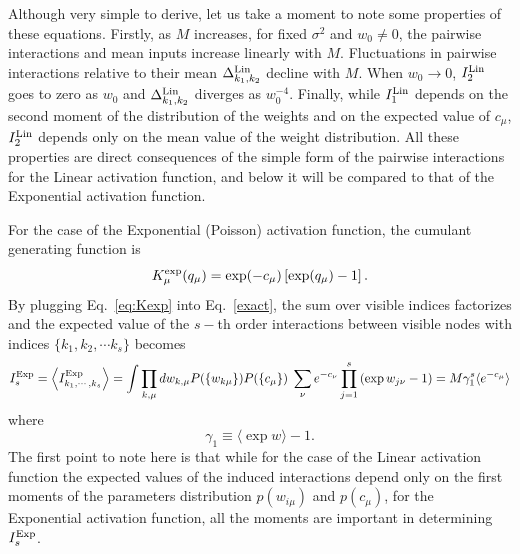 \documentclass[11pt,letterpaper]{article}
\renewcommand{\red}[1]{#1}
\begin{document}
{\red Although very simple to derive, let us take a moment to note some properties of these equations}. Firstly, as $M$ increases, for fixed $\sigma^2$ and $w_0 \neq 0$, the pairwise interactions and mean inputs increase linearly with $M$. Fluctuations in pairwise interactions relative to their mean $\Delta^{\rm Lin}_{k_1,k_2}$ decline with $M$. When $w_0\to 0$, $I^{\rm Lin}_2$ goes to zero as $w_0$ and $\Delta^{\rm Lin}_{k_1,k_2}$ diverges as $w^{-4}_0$. Finally, while $I^{\rm Lin}_1$ depends on the second moment of the distribution of the weights and on the expected value of $c_{\mu}$, $I^{\rm Lin}_{2}$ depends only on the mean value of the weight distribution. All these properties are direct consequences of the simple form of the pairwise interactions for the Linear activation function, and below it will be compared to that of the Exponential activation function.  

For the case of the Exponential (Poisson) activation function, the cumulant generating function is 
\begin{equation}
K^{\rm exp}_{\mu}(q_{\mu})=\exp (-c_{\mu})\left[\exp(q_{\mu})-1  \right].
\label{eq:Kexp}
\end{equation}
By plugging Eq.~\eqref{eq:Kexp} into Eq.~\eqref{exact}, the sum over visible indices factorizes and the expected value of the $s-$th order interactions between visible nodes with indices $\{k_1,k_2, \cdots k_s\}$ becomes
\begin{equation}
I^{\rm Exp}_s  =  \left \langle I^{\rm Exp}_{k_1,\cdots, k_s}\right \rangle = \int \prod_{k,\mu}dw_{k,\mu}  P(\{w_{k\mu}\}) P(\{c_{\mu}\})\; \sum_{\nu} e^{-c_{\nu}} \prod_{j=1}^{s} \left( \exp w_{j\nu}-1\right) = M \gamma_1^s \langle e^{-c_{\mu}}\rangle 
\label{exp_exact}
\end{equation}
where 
\begin{equation}
\gamma_1 \equiv \langle \exp w \rangle-1\label{gamma1}.
\end{equation}
The first point to note here is that while for the case of the Linear activation function the expected values of the induced interactions depend only on the first moments of the parameters distribution $p(w_{i\mu})$ and $p(c_{\mu})$, for the Exponential activation function, all the moments are important in determining $I^{\rm Exp}_{s}$.
\end{document}
